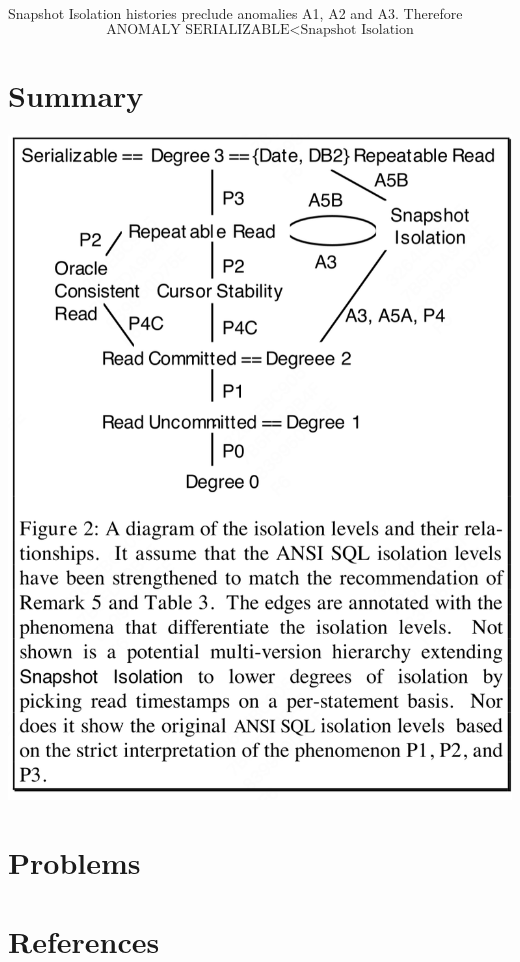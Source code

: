 \documentclass[11pt]{article}
\begin{document}
\begin{remark}[]
Snapshot Isolation histories preclude anomalies A1, A2 and A3. Therefore
\begin{equation*}
\text{ANOMALY SERIALIZABLE}<\text{Snapshot Isolation}
\end{equation*}
\end{remark}
\section{Summary}
\label{sec:orgc0a343f}
\begin{center}
\includegraphics[width=.8\textwidth]{../../images/papers/120.png}
\label{}
\end{center}
\section{Problems}
\label{sec:org22543d9}


\section{References}
\label{sec:org85e04c0}
\label{bibliographystyle link}



\end{document}

